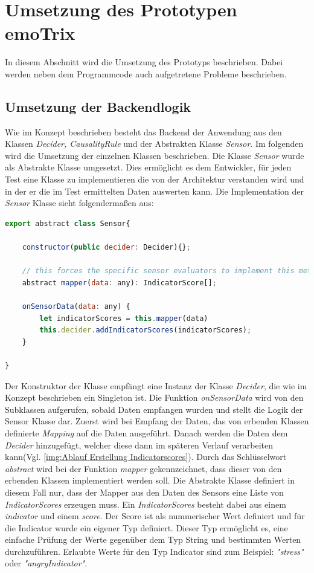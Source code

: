 \section{Umsetzung des Prototypen emoTrix}
In diesem Abschnitt wird die Umsetzung des Prototyps beschrieben. Dabei werden neben dem Programmcode auch aufgetretene Probleme beschrieben.
\subsection{Umsetzung der Backendlogik}
Wie im Konzept beschrieben besteht das Backend der Anwendung aus den Klassen \textit{Decider, CausalityRule} und der Abstrakten Klasse \textit{Sensor}. Im folgenden wird die Umsetzung der einzelnen Klassen beschrieben.\newline
Die Klasse \textit{Sensor} wurde als Abstrakte Klasse umgesetzt. Dies ermöglicht es dem Entwickler, für jeden Test eine Klasse zu implementieren die von der Architektur verstanden wird und in der er die im Test ermittelten Daten auswerten kann. Die Implementation der \textit{Sensor} Klasse sieht folgendermaßen aus: 
\begin{lstlisting}[caption={abstrakte Klasse Sensor},language=JavaScript]
export abstract class Sensor{

	constructor(public decider: Decider){};

	// this forces the specific sensor evaluators to implement this method
	abstract mapper(data: any): IndicatorScore[]; 

	onSensorData(data: any) {
		let indicatorScores = this.mapper(data)
		this.decider.addIndicatorScores(indicatorScores);
	}

}
\end{lstlisting}
Der Konstruktor der Klasse empfängt eine Instanz der Klasse \textit{Decider}, die wie im Konzept beschrieben ein Singleton ist. Die Funktion \textit{onSensorData} wird von den Subklassen aufgerufen, sobald Daten empfangen wurden und stellt die Logik der Sensor Klasse dar. Zuerst wird bei Empfang der Daten, das von erbenden Klassen definierte \textit{Mapping} auf die Daten ausgeführt. Danach werden die Daten dem \textit{Decider} hinzugefügt, welcher diese dann im späteren Verlauf verarbeiten kann(Vgl. \ref{img:Ablauf Erstellung Indicatorscores}). Durch das Schlüsselwort \textit{abstract} wird bei der Funktion \textit{mapper} gekennzeichnet, dass dieser von den erbenden Klassen implementiert werden soll. Die Abstrakte Klasse definiert in diesem Fall nur, dass der Mapper aus den Daten des Sensors eine Liste von \textit{IndicatorScores} erzeugen muss. Ein \textit{IndicatorScores} besteht dabei aus einem \textit{indicator} und einem \textit{score}. Der Score ist als nummerischer Wert definiert und für die Indicator wurde ein eigener Typ definiert. Dieser Typ ermöglicht es, eine einfache Prüfung der Werte gegenüber dem Typ String und bestimmten Werten durchzuführen. Erlaubte Werte für den Typ Indicator sind zum Beispiel: \textit{"stress"} oder \textit{"angryIndicator"}.\newline
